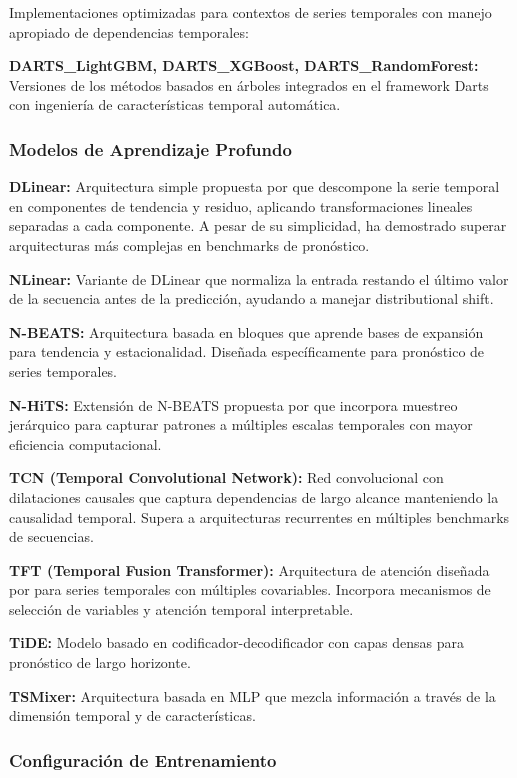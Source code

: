 \documentclass[11pt,a4paper]{article}
\begin{document}
Implementaciones optimizadas para contextos de series temporales con manejo apropiado de dependencias temporales:

\textbf{DARTS\_LightGBM, DARTS\_XGBoost, DARTS\_RandomForest:} Versiones de los métodos basados en árboles integrados en el framework Darts con ingeniería de características temporal automática.

\subsubsection{Modelos de Aprendizaje Profundo}

\textbf{DLinear:} Arquitectura simple propuesta por \citet{zeng2023} que descompone la serie temporal en componentes de tendencia y residuo, aplicando transformaciones lineales separadas a cada componente. A pesar de su simplicidad, ha demostrado superar arquitecturas más complejas en benchmarks de pronóstico.

\textbf{NLinear:} Variante de DLinear que normaliza la entrada restando el último valor de la secuencia antes de la predicción, ayudando a manejar distributional shift.

\textbf{N-BEATS:} Arquitectura basada en bloques que aprende bases de expansión para tendencia y estacionalidad. Diseñada específicamente para pronóstico de series temporales.

\textbf{N-HiTS:} Extensión de N-BEATS propuesta por \citet{challu2023} que incorpora muestreo jerárquico para capturar patrones a múltiples escalas temporales con mayor eficiencia computacional.

\textbf{TCN (Temporal Convolutional Network):} Red convolucional con dilataciones causales \citep{bai2018} que captura dependencias de largo alcance manteniendo la causalidad temporal. Supera a arquitecturas recurrentes en múltiples benchmarks de secuencias.

\textbf{TFT (Temporal Fusion Transformer):} Arquitectura de atención diseñada por \citet{lim2021} para series temporales con múltiples covariables. Incorpora mecanismos de selección de variables y atención temporal interpretable.

\textbf{TiDE:} Modelo basado en codificador-decodificador con capas densas para pronóstico de largo horizonte.

\textbf{TSMixer:} Arquitectura basada en MLP que mezcla información a través de la dimensión temporal y de características.

\subsubsection{Configuración de Entrenamiento}
\end{document}
